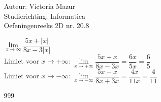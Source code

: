 \documentclass[a4paper,fleqn]{article}
\begin{document}
\noindent \large Auteur: Victoria Mazur \\
\noindent \large Studierichting: Informatica\\
\noindent \large Oefeningenreeks 2D nr. 20.8\\

\medskip

\normalsize

$\displaystyle \lim\limits_{x \to \infty} \dfrac{5x + |x|}{8x - 3|x|}$\\
    
Limiet voor \( x \to +\infty \): $\displaystyle \lim\limits_{x \to +\infty} \dfrac{5x + x}{8x - 3x} = \dfrac{6x}{5x} = \dfrac{6}{5}$\\
    
Limiet voor \( x \to -\infty \): $\displaystyle \lim\limits_{x \to -\infty} \dfrac{5x - x}{8x + 3x} = \dfrac{4x}{11x} = \dfrac{4}{11}$

\begin{thebibliography}{999}
\end{thebibliography}
\end{document}
